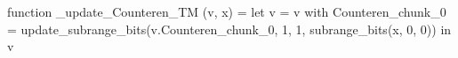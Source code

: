 function _update_Counteren_TM (v, x) = let v = { v with Counteren_chunk_0 = update_subrange_bits(v.Counteren_chunk_0, 1, 1, subrange_bits(x, 0, 0)) } in
  v
